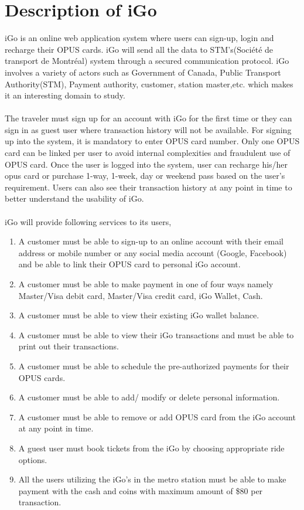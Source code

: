 \documentclass[a4paper, 11pt]{report}
\begin{document}
\section{Description of iGo}
iGo is an online web application system where users can sign-up, login and recharge their OPUS cards. iGo will send all the data to STM's(Société de transport de Montréal) system through a secured communication protocol. iGo involves a variety of actors such as Government of Canada, Public Transport Authority(STM), Payment authority, customer, station master,etc. which makes it an interesting domain to study. \\\\
The traveler must sign up for an account with iGo for the first time or they can sign in as guest user where transaction history will not be available. For signing up into the system, it is mandatory to enter OPUS card number. Only one OPUS card can be linked per user to avoid internal complexities and fraudulent use of OPUS card. Once the user is logged into the system, user can recharge his/her opus card or purchase 1-way, 1-week, day or weekend pass based on the user's requirement. Users can also see their transaction history at any point in time to better understand the usability of iGo.\\\\
iGo will provide following services to its users,

\begin{enumerate}
    \item A customer must be able to sign-up to an online account with their email address or mobile number or any social media account (Google, Facebook) and be able to link their OPUS card to personal iGo account.
    \item A customer must be able to make payment in one of four ways namely Master/Visa debit card, Master/Visa credit card, iGo Wallet, Cash.
    \item A customer must be able to view their existing iGo wallet balance.
    \item A customer must be able to view their iGo transactions and must be able to print out their transactions.
    \item A customer must be able to schedule the pre-authorized payments for their OPUS cards.
    \item A customer must be able to add/ modify or delete personal information.
    \item A customer must be able to remove or add OPUS card from the iGo account at any point in time.
    \item A guest user must book tickets from the iGo by choosing appropriate ride options.
    \item All the users utilizing the iGo's in the metro station must be able to make payment with the cash and coins with maximum amount of \$80 per transaction.
\end{enumerate}
\end{document}
